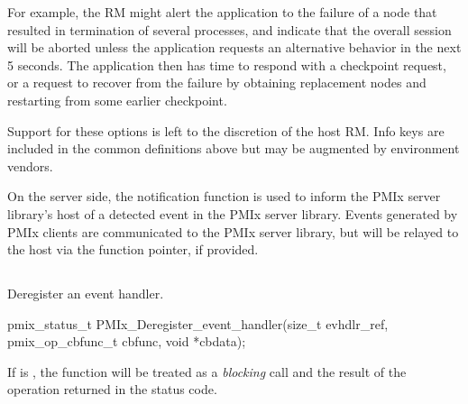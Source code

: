 For example, the \ac{RM} might alert the application to the failure of a node that resulted in termination of several processes, and indicate that the overall session will be aborted unless the application requests an alternative behavior in the next 5 seconds. The application then has time to respond with a checkpoint request, or a request to recover from the failure by obtaining replacement nodes and restarting from some earlier checkpoint.

Support for these options is left to the discretion of the host \ac{RM}. Info keys are included in the common definitions above but may be augmented by environment vendors.
\adviceuserend

\advicermstart
On the server side, the notification function is used to inform the \ac{PMIx} server library's host of a detected event in the \ac{PMIx} server library. Events generated by \ac{PMIx} clients are communicated to the \ac{PMIx} server library, but will be relayed to the host via the  function pointer, if provided.
\advicermend


\subsection{}

\summary

Deregister an event handler.

\format

\cspecificstart
\begin{codepar}
pmix_status_t
PMIx_Deregister_event_handler(size_t evhdlr_ref,
                              pmix_op_cbfunc_t cbfunc,
                              void *cbdata);
\end{codepar}
\cspecificend

\begin{arglist}
\end{arglist}

If  is , the function will be treated as a \emph{blocking} call and the result of the operation returned in the status code.

